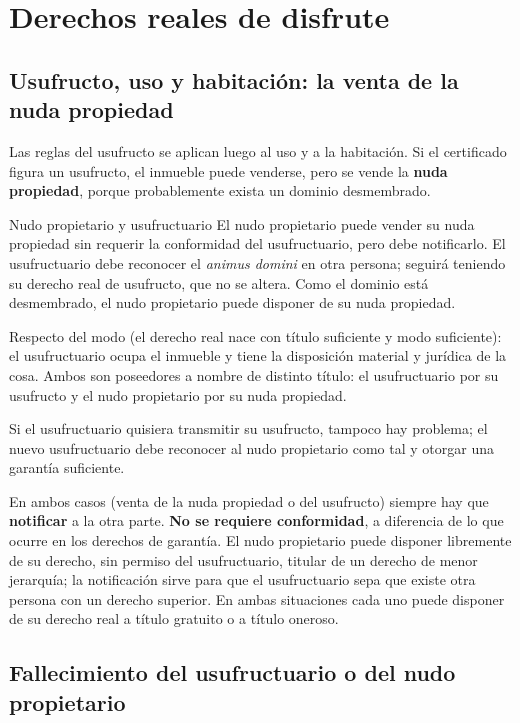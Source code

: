 \documentclass[12pt,oneside]{book}
\begin{document}
\section{Derechos reales de disfrute}

\subsection{Usufructo, uso y habitación: la venta de la nuda propiedad}

Las reglas del usufructo se aplican luego al uso y a la habitación. Si el certificado figura un usufructo, el inmueble puede venderse, pero se vende la \textbf{nuda propiedad}, porque probablemente exista un dominio desmembrado.

\begin{example}{Nudo propietario y usufructuario}
El nudo propietario puede vender su nuda propiedad sin requerir la conformidad del usufructuario, pero debe notificarlo. El usufructuario debe reconocer el \textit{animus domini} en otra persona; seguirá teniendo su derecho real de usufructo, que no se altera. Como el dominio está desmembrado, el nudo propietario puede disponer de su nuda propiedad.
\end{example}

Respecto del modo (el derecho real nace con título suficiente y modo suficiente): el usufructuario ocupa el inmueble y tiene la disposición material y jurídica de la cosa. Ambos son poseedores a nombre de distinto título: el usufructuario por su usufructo y el nudo propietario por su nuda propiedad.

Si el usufructuario quisiera transmitir su usufructo, tampoco hay problema; el nuevo usufructuario debe reconocer al nudo propietario como tal y otorgar una garantía suficiente.

\begin{important}
En ambos casos (venta de la nuda propiedad o del usufructo) siempre hay que \textbf{notificar} a la otra parte. \textbf{No se requiere conformidad}, a diferencia de lo que ocurre en los derechos de garantía. El nudo propietario puede disponer libremente de su derecho, sin permiso del usufructuario, titular de un derecho de menor jerarquía; la notificación sirve para que el usufructuario sepa que existe otra persona con un derecho superior. En ambas situaciones cada uno puede disponer de su derecho real a título gratuito o a título oneroso.
\end{important}

\subsection{Fallecimiento del usufructuario o del nudo propietario}
\end{document}
